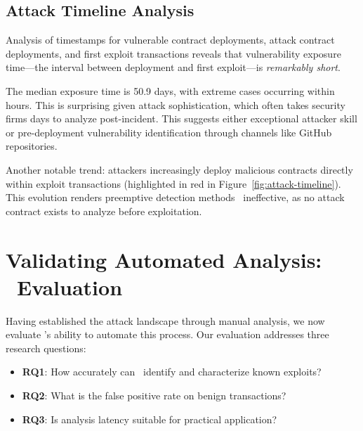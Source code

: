 
\subsection{Attack Timeline Analysis}
\label{sec:results-timeline}

Analysis of timestamps for vulnerable contract deployments, attack contract deployments, and first exploit transactions reveals that vulnerability exposure time---the interval between deployment and first exploit---is \textit{remarkably short}.


The median exposure time is 50.9 days, with extreme cases occurring within hours. This is surprising given attack sophistication, which often takes security firms days to analyze post-incident. This suggests either exceptional attacker skill or pre-deployment vulnerability identification through channels like GitHub repositories.

Another notable trend: attackers increasingly deploy malicious contracts directly within exploit transactions (highlighted in red in Figure~\ref{fig:attack-timeline}). This evolution renders preemptive detection methods~\cite{attack-contract-detection, backrunner} ineffective, as no attack contract exists to analyze before exploitation.


\section{Validating Automated Analysis: \ToolName\ Evaluation}
\label{sec:results-tool}

Having established the attack landscape through manual analysis, we now evaluate \ToolName's ability to automate this process. Our evaluation addresses three research questions:

\begin{itemize}
    \item \textbf{RQ1}: How accurately can \ToolName\ identify and characterize known exploits?
    \item \textbf{RQ2}: What is the false positive rate on benign transactions?
    \item \textbf{RQ3}: Is analysis latency suitable for practical application?
\end{itemize}

